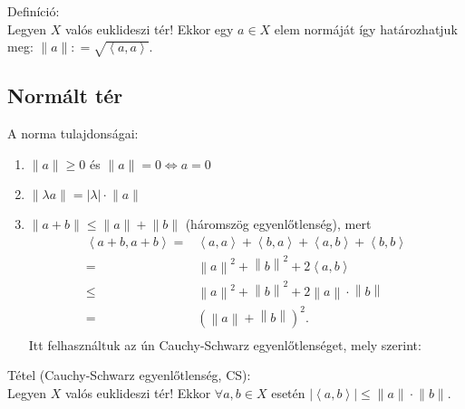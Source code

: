 \documentclass[12pt,a4paper]{scrartcl}
\providecommand{\tightlist}{%
  \setlength{\itemsep}{0pt}\setlength{\parskip}{0pt}}
\newenvironment{definicio}{}{}
\newenvironment{tetel}{}{}
\begin{document}
\begin{definicio}

Definíció:\\
Legyen \(X\) valós euklideszi tér! Ekkor egy \(a \in X\) elem normáját
így határozhatjuk meg:
\(\left\| a \parallel \right.: = \sqrt{\left\langle {a,a} \right\rangle}\).

\end{definicio}

\hypertarget{normalt-ter}{%
\subsection{Normált tér}\label{normalt-ter}}

A norma tulajdonságai:

\begin{enumerate}
\def\labelenumi{\arabic{enumi}.}
\tightlist
\item
  \(\left\| a \parallel \right. \geq 0\) és
  \(\left. \left\| a \parallel \right. = 0\Leftrightarrow a = 0 \right.\)
\item
  \(\left\| {\lambda a} \parallel \right. = \left| \lambda \right| \cdot \left\| a \parallel \right.\)
\item
  \(\left\| {a + b} \parallel \right. \leq \left\| a \parallel \right. + \left\| b \parallel \right.\)
  (háromszög egyenlőtlenség), mert \[\begin{aligned}
    \left\langle {a + b,a + b} \right\rangle  =  & \left\langle {a,a} \right\rangle  + \left\langle {b,a} \right\rangle  + \left\langle {a,b} \right\rangle  + \left\langle {b,b} \right\rangle  \\ 
     =  & {\left\| a \right\|^2} + {\left\| b \right\|^2} + 2\left\langle {a,b} \right\rangle  \\ 
     \leqslant  & {\left\| a \right\|^2} + {\left\| b \right\|^2} + 2\left\| a \right\| \cdot \left\| b \right\| \\ 
     =  & {\left( {\left\| a \right\| + \left\| b \right\|} \right)^2}. \\ 
  \end{aligned} \] Itt felhasználtuk az ún Cauchy-Schwarz
  egyenlőtlenséget, mely szerint:
\end{enumerate}

\hypertarget{cauchy-schwarz}{}
\begin{tetel}

Tétel (Cauchy-Schwarz egyenlőtlenség, CS):\\
Legyen \(X\) valós euklideszi tér! Ekkor \(\forall a,b \in X\) esetén
\(\left| \left\langle {a,b} \right\rangle \right| \leq \left\| a \parallel \right. \cdot \left\| b \parallel \right.\).

\end{tetel}
\end{document}
